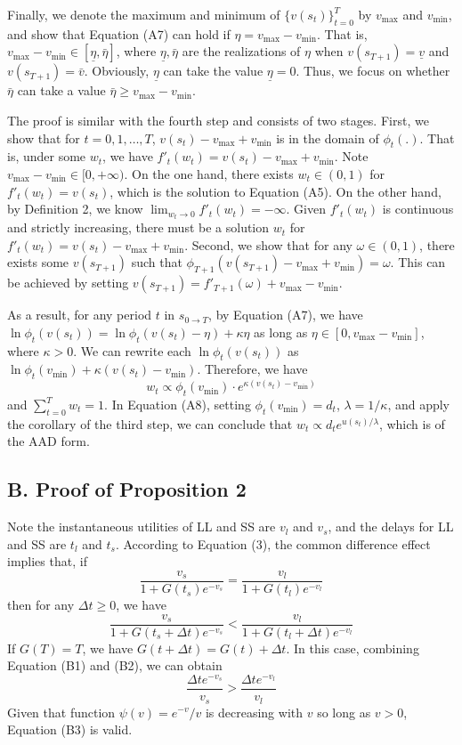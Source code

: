\documentclass[
  12pt,
]{article}
\begin{document}
Finally, we denote the maximum and minimum of \(\{v(s_t)\}_{t=0}^T\) by
\(v_{\max}\) and \(v_{\min}\), and show that Equation (A7) can hold if
\(\eta = v_{\max} - v_{\min}\). That is,
\(v_{\max}-v_{\min}\in [\underline{\eta},\bar{\eta}]\), where
\(\underline{\eta}, \bar{\eta}\) are the realizations of \(\eta\) when
\(v(s_{T+1})=\underline{v}\) and \(v(s_{T+1})=\bar{v}\). Obviously,
\(\underline{\eta}\) can take the value \(\underline{\eta}=0\). Thus, we
focus on whether \(\bar{\eta}\) can take a value
\(\bar{\eta}\geq v_{\max}-v_{\min}\).

The proof is similar with the fourth step and consists of two stages.
First, we show that for \(t=0,1,…,T\), \(v(s_t)-v_{\max}+v_{\min}\) is
in the domain of \(\phi_t(.)\). That is, under some \(w_t\), we have
\(f'_t(w_t)=v(s_t)-v_{\max}+v_{\min}\). Note
\(v_{\max}-v_{\min}\in[0,+\infty)\). On the one hand, there exists
\(w_t\in(0,1)\) for \(f'_t(w_t)=v(s_t)\), which is the solution to
Equation (A5). On the other hand, by Definition 2, we know
\(\lim_{w_t\rightarrow 0}f'_t(w_t)=-\infty\). Given \(f'_t(w_t)\) is
continuous and strictly increasing, there must be a solution \(w_t\) for
\(f'_t(w_t)=v(s_t)-v_{\max}+v_{\min}\). Second, we show that for any
\(\omega\in(0,1)\), there exists some \(v(s_{T+1})\) such that
\(\phi_{T+1}(v(s_{T+1})-v_{\max}+v_{\min})=\omega\). This can be
achieved by setting \(v(s_{T+1})=f'_{T+1}(\omega)+v_{\max}-v_{\min}\).

As a result, for any period \(t\) in \(s_{0\rightarrow T}\), by Equation
(A7), we have \(\ln \phi_t(v(s_t))=\ln\phi_t(v(s_t)-\eta)+\kappa\eta\)
as long as \(\eta\in[0,v_{\max}-v_{\min}]\), where \(\kappa>0\). We can
rewrite each \(\ln \phi_t(v(s_t))\) as
\(\ln \phi_t(v_{\min})+\kappa(v(s_t)-v_{\min})\). Therefore, we
have\[\tag{A8}
w_t \propto \phi_t(v_{\min})\cdot e^{\kappa(v(s_t)-v_{\min})}
\]and \(\sum_{t=0}^T w_t=1\). In Equation (A8), setting
\(\phi_t(v_{\min})=d_t\), \(\lambda = 1/\kappa\), and apply the
corollary of the third step, we can conclude that
\(w_t\propto d_t e^{u(s_t)/\lambda}\), which is of the AAD form.

\hypertarget{b.-proof-of-proposition-2}{%
\subsection*{B. Proof of Proposition
2}\label{b.-proof-of-proposition-2}}

Note the instantaneous utilities of LL and SS are \(v_l\) and \(v_s\),
and the delays for LL and SS are \(t_l\) and \(t_s\). According to
Equation (3), the common difference effect implies that, if\[ \tag{B1}
\frac{v_s}{1+G(t_s)e^{-v_s}} = \frac{v_l}{1+G(t_l)e^{-v_l}}
\]then for any \(\Delta t \geq 0\), we have \[ \tag{B2}
\frac{v_s}{1+G(t_s+\Delta t)e^{-v_s}} < \frac{v_l}{1+G(t_l+\Delta t)e^{-v_l}}
\]If \(G(T)=T\), we have \(G(t+\Delta t) = G(t) + \Delta t\). In this
case, combining Equation (B1) and (B2), we can obtain\[ \tag{B3}
\frac{\Delta t e^{-v_s}}{v_s} > \frac{\Delta t e^{-v_l}}{v_l}
\]Given that function \(\psi(v) = e^{-v}/v\) is decreasing with \(v\) so
long as \(v>0\), Equation (B3) is valid.
\end{document}
